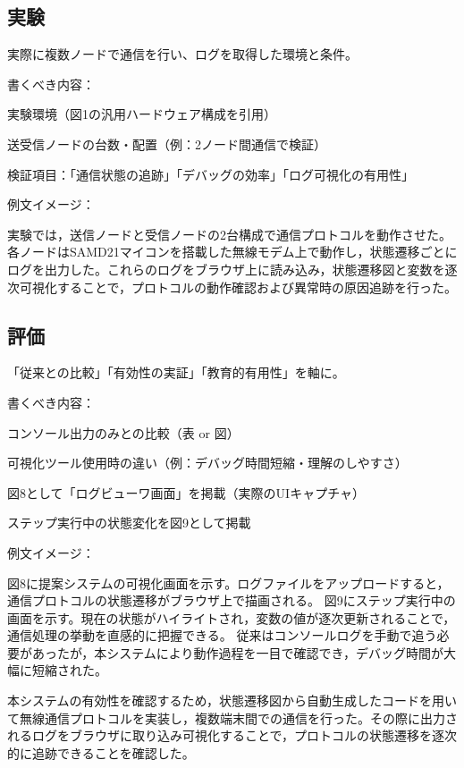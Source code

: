\documentclass[paper]{ieicej}
\begin{document}
\subsection{実験}
実際に複数ノードで通信を行い、ログを取得した環境と条件。

書くべき内容：

実験環境（図1の汎用ハードウェア構成を引用）

送受信ノードの台数・配置（例：2ノード間通信で検証）

検証項目：「通信状態の追跡」「デバッグの効率」「ログ可視化の有用性」

例文イメージ：

実験では，送信ノードと受信ノードの2台構成で通信プロトコルを動作させた。各ノードはSAMD21マイコンを搭載した無線モデム上で動作し，状態遷移ごとにログを出力した。これらのログをブラウザ上に読み込み，状態遷移図と変数を逐次可視化することで，プロトコルの動作確認および異常時の原因追跡を行った。

\subsection{評価}
「従来との比較」「有効性の実証」「教育的有用性」を軸に。

書くべき内容：

コンソール出力のみとの比較（表 or 図）

可視化ツール使用時の違い（例：デバッグ時間短縮・理解のしやすさ）

図8として「ログビューワ画面」を掲載（実際のUIキャプチャ）

ステップ実行中の状態変化を図9として掲載

例文イメージ：

図8に提案システムの可視化画面を示す。ログファイルをアップロードすると，通信プロトコルの状態遷移がブラウザ上で描画される。
図9にステップ実行中の画面を示す。現在の状態がハイライトされ，変数の値が逐次更新されることで，通信処理の挙動を直感的に把握できる。
従来はコンソールログを手動で追う必要があったが，本システムにより動作過程を一目で確認でき，デバッグ時間が大幅に短縮された。


本システムの有効性を確認するため，状態遷移図から自動生成したコードを用いて無線通信プロトコルを実装し，複数端末間での通信を行った。その際に出力されるログをブラウザに取り込み可視化することで，プロトコルの状態遷移を逐次的に追跡できることを確認した。
\end{document}
